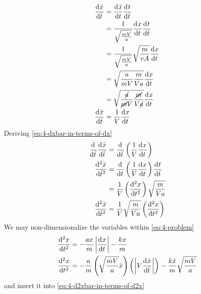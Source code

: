 \documentclass[12pt,twoside]{article}
\begin{document}
\begin{equation}
  \label{eq:4-dxbar-in-terms-of-dx}
  \begin{aligned}
    \od{\bar{x}}{\bar{t}} &= \od{\bar{x}}{t}\od{t}{\bar{t}} \\
    &= \frac{1}{\sqrt{\frac{mV}{a}}}\od{x}{t}\od{t}{\bar{t}} \\
    &= \frac{1}{\sqrt{\frac{mV}{a}}}\sqrt{\frac{m}{vA}}\od{x}{t} \\
    &= \sqrt{\frac{a}{mV}\frac{m}{Va}} \od{x}{t} \\
    &= \sqrt{\frac{\cancel{a}}{\cancel{m}V}\frac{\cancel{m}}{V\cancel{a}}}
    \od{x}{t} \\
    \od{\bar{x}}{\bar{t}} &= \frac{1}{V}\od{x}{t} \\
  \end{aligned}
\end{equation}
Deriving \cref{eq:4-dxbar-in-terms-of-dx}
\begin{equation}
  \label{eq:4-d2xbar-in-terms-of-d2x}
  \begin{aligned}
    \od{}{\bar{t}}\od{\bar{x}}{\bar{t}} &= \od{}{\bar{t}} \left(\frac{1}{V}\od{x}{t}\right) \\
    \od[2]{\bar{x}}{\bar{t}} &= \od{}{t}
    \left(\frac{1}{V}\od{x}{t}\right) \od{t}{\bar{t}} \\
    &= \frac{1}{V} \left(\od[2]{x}{t}\right) \sqrt{\frac{m}{Va}} \\
    \od[2]{\bar{x}}{\bar{t}} &= \frac{1}{V}\sqrt{\frac{m}{Va}} \left(\od[2]{x}{t}\right) \\
  \end{aligned}
\end{equation}
We may non-dimensionalize the variables within \cref{eq:4-problem}
\begin{equation}
  \label{eq:4-equation}
  \begin{aligned}
    \od[2]{x}{t} &= -\frac{ax}{m} \abs{\od{x}{t}} - \frac{kx}{m} \\
    \od[2]{x}{t} &= -\frac{a}{m}\left( \sqrt{\frac{mV}{a}}\bar{x}\right)
    \left( \abs{V\od{\bar{x}}{\bar{t}}}\right) -
    \frac{k\bar{x}}{m}\sqrt{\frac{mV}{a}} \\
  \end{aligned}
\end{equation}
and insert it into \cref{eq:4-d2xbar-in-terms-of-d2x}
\end{document}
